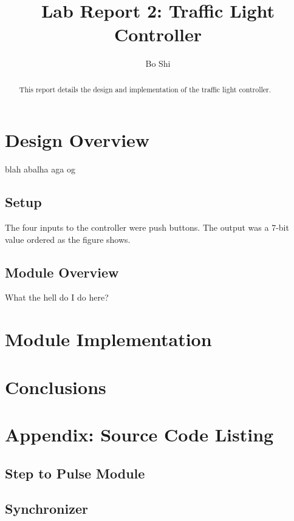 \documentclass{article}
\author{Bo Shi}
\title{Lab Report 2: Traffic Light Controller}
\begin{document}
\maketitle

\begin{abstract}
This report details the design and implementation of the traffic light controller.
\end{abstract}

\newpage
\tableofcontents

\newpage
\listoffigures 
\listoftables 

\newpage
\section{Design Overview}
	blah abalha aga og

	\subsection{Setup}
		The four inputs to the controller were push buttons.  The output was a 7-bit
		value ordered as the figure shows.
	

	\subsection{Module Overview}
		What the hell do I do here?

\section{Module Implementation}

\section{Conclusions}

\newpage
\section{Appendix: Source Code Listing}
	\subsection{Step to Pulse Module}
		\begin{lgrind}
		
		\end{lgrind}

	\newpage
	\subsection{Synchronizer}
		\begin{lgrind}
		
		\end{lgrind}
\end{document}
